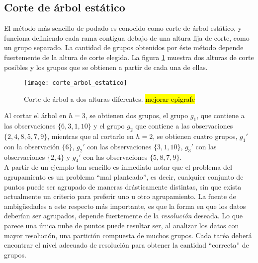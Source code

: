 \subsection{Corte de árbol estático}
El método más sencillo de podado es conocido como corte de árbol estático, y funciona definiendo cada rama contigua debajo de una altura fija de corte, como un grupo separado. La cantidad de grupos obtenidos por éste método depende fuertemente de la altura de  corte elegida. La figura \ref{fig:corte_arbol_estatico} muestra dos alturas de corte posibles y los grupos que se obtienen a partir de cada una de ellas.
\begin{figure}[h]
    \centering
    \texttt{[image: corte\_arbol\_estatico]}
    \caption{Corte de árbol a dos alturas diferentes. \hl{mejorar epigrafe}}
    \label{fig:corte_arbol_estatico}
\end{figure}
Al cortar el árbol en $h=3$, se obtienen dos grupos, el grupo $g_1$, que contiene a las observaciones $\{6, 3, 1, 10\}$ y el grupo $g_2$ que contiene a las observaciones $\{2, 4, 8, 5, 7, 9\}$, mientras que al cortarlo en $h=2$, se obtienen cuatro grupos, $g_1'$ con la observación $\{6\}$, $g_2'$ con las observaciones $\{3, 1, 10\}$, $g_3'$ con las observaciones $\{2, 4\}$ y $g_4'$ con las observaciones $\{5, 8, 7, 9\}$.\\
A partir de un ejemplo tan sencillo es inmediato notar que el problema del agrupamiento es un problema ``mal planteado'', es decir, cualquier conjunto de puntos puede ser agrupado de maneras drásticamente distintas, sin que exista actualmente un criterio para preferir uno u otro agrupamiento. La fuente de ambigüedades a este respecto más importante, es que la forma en que los datos deberían ser agrupados, depende fuertemente de la \textit{resolución} deseada. Lo que parece una única nube de puntos puede resultar ser, al analizar los datos con mayor resolución, una partición compuesta de muchos grupos. Cada taréa deberá encontrar el nivel adecuado de resolución para obtener la cantidad ``correcta'' de grupos.\cite{Domany1999}\cite{Langfelder2008}

